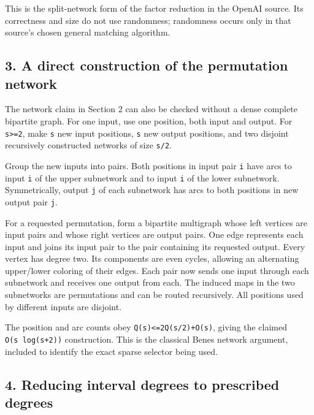 This is the split-network form of the factor reduction in the OpenAI source. Its correctness and size do not use randomness; randomness occurs only in that source's chosen general matching algorithm.

\hypertarget{af-9f2952a6d0-a-direct-construction-of-the-permutation-network}{%
\subsection{3. A direct construction of the permutation network}\label{af-9f2952a6d0-a-direct-construction-of-the-permutation-network}}

The network claim in Section 2 can also be checked without a dense complete bipartite graph. For one input, use one position, both input and output. For \texttt{s\textgreater{}=2}, make \texttt{s} new input positions, \texttt{s} new output positions, and two disjoint recursively constructed networks of size \texttt{s/2}.

Group the new inputs into pairs. Both positions in input pair \texttt{i} have arcs to input \texttt{i} of the upper subnetwork and to input \texttt{i} of the lower subnetwork. Symmetrically, output \texttt{j} of each subnetwork has arcs to both positions in new output pair \texttt{j}.

For a requested permutation, form a bipartite multigraph whose left vertices are input pairs and whose right vertices are output pairs. One edge represents each input and joins its input pair to the pair containing its requested output. Every vertex has degree two. Its components are even cycles, allowing an alternating upper/lower coloring of their edges. Each pair now sends one input through each subnetwork and receives one output from each. The induced maps in the two subnetworks are permutations and can be routed recursively. All positions used by different inputs are disjoint.

The position and arc counts obey \texttt{Q(s)\textless{}=2Q(s/2)+O(s)}, giving the claimed \texttt{O(s\ log(s+2))} construction. This is the classical Benes network argument, included to identify the exact sparse selector being used.

\hypertarget{af-9f2952a6d0-reducing-interval-degrees-to-prescribed-degrees}{%
\subsection{4. Reducing interval degrees to prescribed degrees}\label{af-9f2952a6d0-reducing-interval-degrees-to-prescribed-degrees}}

